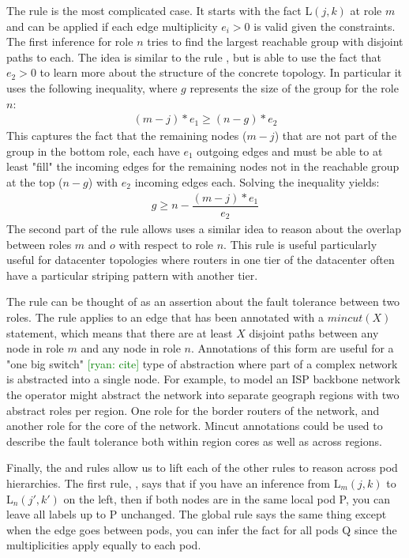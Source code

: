\documentclass[numbers, 10pt, preprint]{sigplanconf}
\newcommand{\ryan}[1]{\textcolor{green}{[ryan: #1]}}
\begin{document}
The rule  is the most complicated case.
It starts with the fact L$(j,k)$ at role $m$ and can be applied if each edge multiplicity $e_i > 0$ is valid given the constraints. The first inference for role $n$ tries to find the largest reachable group with disjoint paths to each. The idea is similar to the rule , but is able to use the fact that $e_2 > 0$ to learn more about the structure of the concrete topology. In particular it uses the following inequality, where $g$ represents the size of the group for the role $n$:
%
\[ \begin{array}{c}
  (m-j)*e_1 \geq (n-g)*e_2
\end{array} \]
\noindent
%
This captures the fact that the remaining nodes ($m-j$) that are not part of the group in the bottom role, each have $e_1$ outgoing edges and must be able to at least "fill" the incoming edges for the remaining nodes not in the reachable group at the top ($n-g$) with $e_2$ incoming edges each. Solving the inequality yields:
%
\[ \begin{array}{c}
  g \geq n - \dfrac{(m-j)*e_1}{e_2}
\end{array} \]
\noindent
%
The second part of the rule allows uses a similar idea to reason about the overlap between roles $m$ and $o$ with respect to role $n$. This rule is useful particularly useful for datacenter topologies where routers in one tier of the datacenter often have a particular striping pattern with another tier.

The rule  can be thought of as an assertion about the fault tolerance between two roles. The rule applies to an edge that has been annotated with a $mincut(X)$ statement, which means that there are at least $X$ disjoint paths between any node in role $m$ and any node in role $n$. Annotations of this form are useful for a "one big switch" \ryan{cite} type of abstraction where part of a complex network is abstracted into a single node. For example, to model an ISP backbone network the operator might abstract the network into separate geograph regions with two abstract roles per region. One role for the border routers of the network, and another role for the core of the network. Mincut annotations could be used to describe the fault tolerance both within region cores as well as across regions.

Finally, the  and  rules allow us to lift each of the other rules to reason across pod hierarchies. The first rule, , says that if you have an inference from L$_m(j,k)$ to L$_n(j',k')$ on the left, then if both nodes are in the same local pod P, you can leave all labels up to P unchanged. The global rule  says the same thing except when the edge goes between pods, you can infer the fact for all pods Q since the multiplicities apply equally to each pod.
\end{document}
